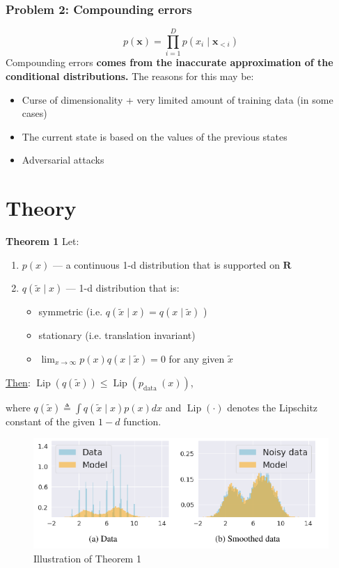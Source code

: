 \documentclass[t]{beamer}  %
\begin{document}
\begin{frame}[h]
\frametitle{Problem 2: Compounding errors}
$$
p(\bm{x})=\prod_{i=1}^{D} p\left(x_{i} \mid \bm{x}_{<i}\right)
$$
Compounding errors \textbf{comes from the inaccurate approximation of the conditional distributions.}  
\newline
\newline
The reasons for this may be:
\begin{itemize}
\item Curse of dimensionality + very limited amount of training data (in some cases)
\item The current state is based on the values of the previous states
\item Adversarial attacks
\end{itemize}
\end{frame}

\section{Theory \cite{orig}}
\begin{frame}[t]
\textbf{Theorem 1} Let: 
\begin{enumerate}
    \item $p(x)$ --- a continuous 1-d distribution that is supported on $\bm{R}$
    \item $q(\tilde{x} \mid x)$ --- 1-d distribution that is:
    \begin{itemize}
        \item symmetric (i.e. $q(\tilde{x} \mid x)=q(x \mid \tilde{x})$ )
        \item stationary (i.e. translation invariant)
        \item $\lim _{x \rightarrow \infty} p(x) q(x \mid \tilde{x})=0$ for any given $\tilde{x}$
    \end{itemize}
\end{enumerate}
\underline{Then}:
$\operatorname{Lip}(q(\tilde{x})) \leq \operatorname{Lip}\left(p_{\text {data }}(x)\right)$,

where $q(\tilde{x}) \triangleq \int q(\tilde{x} \mid x) p(x) d x$ and $\operatorname{Lip}(\cdot)$ denotes the Lipschitz constant of the given $1-d$ function.

\begin{figure}[h]

\includegraphics[scale=1]{images/ill_th1.pdf}
\caption{ Illustration of Theorem 1 \cite{orig}}
\end{figure}
\end{frame}
\end{document}

